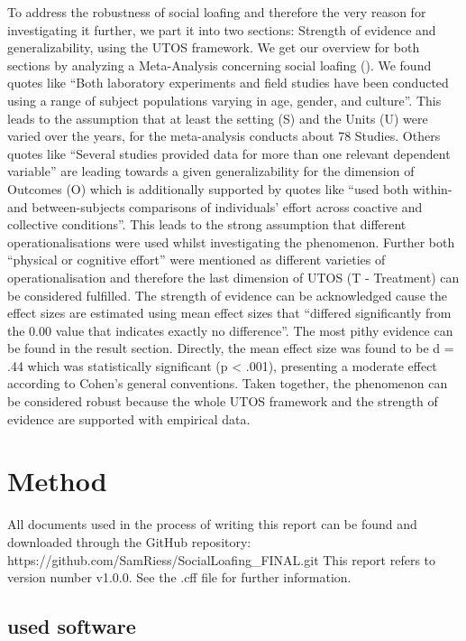 \documentclass[
  man,
  longtable,
  a4paper,
  nolmodern,
  notxfonts,
  notimes,
  colorlinks=true,linkcolor=blue,citecolor=blue,urlcolor=blue]{apa7}
\begin{document}
To address the robustness of social loafing and therefore the very
reason for investigating it further, we part it into two sections:
Strength of evidence and generalizability, using the UTOS framework. We
get our overview for both sections by analyzing a Meta-Analysis
concerning social loafing (). We found quotes like ``Both laboratory experiments and field
studies have been conducted using a range of subject populations varying
in age, gender, and culture''. This leads to the assumption that at
least the setting (S) and the Units (U) were varied over the years, for
the meta-analysis conducts about 78 Studies. Others quotes like
``Several studies provided data for more than one relevant dependent
variable'' are leading towards a given generalizability for the
dimension of Outcomes (O) which is additionally supported by quotes like
``used both within- and between-subjects comparisons of individuals'
effort across coactive and collective conditions''. This leads to the
strong assumption that different operationalisations were used whilst
investigating the phenomenon. Further both ``physical or cognitive
effort'' were mentioned as different varieties of operationalisation and
therefore the last dimension of UTOS (T - Treatment) can be considered
fulfilled. The strength of evidence can be acknowledged cause the effect
sizes are estimated using mean effect sizes that ``differed
significantly from the 0.00 value that indicates exactly no
difference''. The most pithy evidence can be found in the result
section. Directly, the mean effect size was found to be d = .44 which
was statistically significant (p \textless{} .001), presenting a
moderate effect according to Cohen's general conventions. Taken
together, the phenomenon can be considered robust because the whole UTOS
framework and the strength of evidence are supported with empirical
data.

\section{Method}\label{method}

All documents used in the process of writing this report can be found
and downloaded through the GitHub repository:
https://github.com/SamRiess/SocialLoafing\_FINAL.git This report refers
to version number v1.0.0. See the .cff file for further information.

\subsection{used software}\label{used-software}
\end{document}
